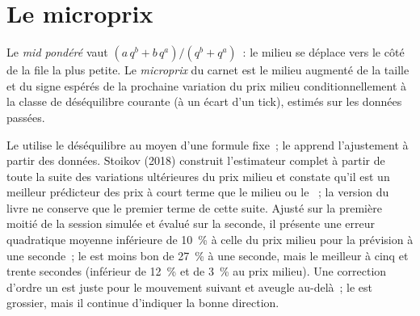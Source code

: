 \section{Le microprix}

\begin{definition}\label{def:rs:order-book-features:micro}
Le \emph{mid pondéré} vaut $(a\,q^b + b\,q^a)/(q^b + q^a)$~: le milieu se déplace vers le côté de la file la plus petite. Le
\emph{microprix} du carnet est le milieu augmenté de la taille et du signe espérés de la prochaine variation du prix milieu conditionnellement à
la classe de déséquilibre courante (à un écart d'un tick), estimés sur les données passées.
\end{definition}

Le  utilise le déséquilibre au moyen d'une formule fixe~; le  apprend l'ajustement à partir des données. Stoikov (2018) construit
l'estimateur complet à partir de toute la suite des variations ultérieures du prix milieu et constate qu'il est un meilleur prédicteur des prix à court terme que le milieu ou le ~;
la version du livre ne conserve que le premier terme de cette suite. Ajusté sur la première moitié de la session simulée et évalué sur la seconde, il présente une erreur quadratique moyenne
inférieure de 10~\% à celle du prix milieu pour la prévision à une seconde~; le  est moins bon de 27~\% à une seconde, mais le meilleur à cinq
et trente secondes (inférieur de 12~\% et de 3~\% au prix milieu). Une correction d'ordre un est juste pour le mouvement suivant et aveugle au-delà~;
le  est grossier, mais il continue d'indiquer la bonne direction.

